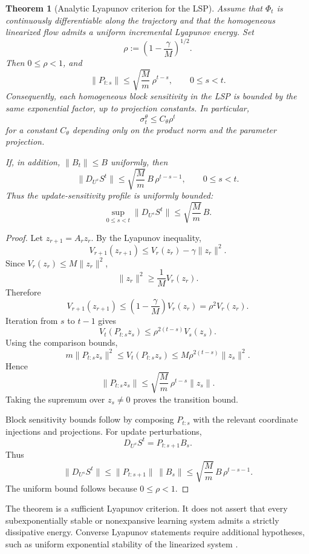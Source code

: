 \documentclass{article}
\newtheorem{theorem}{Theorem}[section]
\numberwithin{equation}{section}
\begin{document}
\begin{theorem}[Analytic Lyapunov criterion for the LSP]
\label{thm:fundamental-analytic-stability}
Assume that \(\Phi_t\) is continuously differentiable along the trajectory and
that the homogeneous linearized flow admits a uniform incremental Lyapunov
energy. Set
\[
\rho:=\left(1-\frac{\gamma}{M}\right)^{1/2}.
\]
Then \(0\le\rho<1\), and
\[
\|P_{t:s}\|
\le
\sqrt{\frac{M}{m}}\,\rho^{t-s},
\qquad
0\le s<t .
\]
Consequently, each homogeneous block sensitivity in the LSP is bounded by the
same exponential factor, up to projection constants. In particular,
\[
\sigma^\theta_t
\le
C_\theta\rho^t
\]
for a constant \(C_\theta\) depending only on the product norm and the parameter
projection.

If, in addition, \(\|B_t\|\le B\) uniformly, then
\[
\|D_{U^s}S^t\|
\le
\sqrt{\frac{M}{m}}\,B\,\rho^{t-s-1},
\qquad
0\le s<t .
\]
Thus the update-sensitivity profile is uniformly bounded:
\[
\sup_{0\le s<t}\|D_{U^s}S^t\|
\le
\sqrt{\frac{M}{m}}\,B .
\]
\end{theorem}

\begin{proof}
Let \(z_{r+1}=A_rz_r\). By the Lyapunov inequality,
\[
V_{r+1}(z_{r+1})
\le
V_r(z_r)-\gamma\|z_r\|^2 .
\]
Since \(V_r(z_r)\le M\|z_r\|^2\),
\[
\|z_r\|^2\ge \frac{1}{M}V_r(z_r).
\]
Therefore
\[
V_{r+1}(z_{r+1})
\le
\left(1-\frac{\gamma}{M}\right)V_r(z_r)
=
\rho^2 V_r(z_r).
\]
Iteration from \(s\) to \(t-1\) gives
\[
V_t(P_{t:s}z_s)
\le
\rho^{2(t-s)}V_s(z_s).
\]
Using the comparison bounds,
\[
m\|P_{t:s}z_s\|^2
\le
V_t(P_{t:s}z_s)
\le
M\rho^{2(t-s)}\|z_s\|^2 .
\]
Hence
\[
\|P_{t:s}z_s\|
\le
\sqrt{\frac{M}{m}}\,\rho^{t-s}\|z_s\|.
\]
Taking the supremum over \(z_s\ne0\) proves the transition bound.

Block sensitivity bounds follow by composing \(P_{t:s}\) with the relevant
coordinate injections and projections. For update perturbations,
\[
D_{U^s}S^t=P_{t:s+1}B_s .
\]
Thus
\[
\|D_{U^s}S^t\|
\le
\|P_{t:s+1}\|\,\|B_s\|
\le
\sqrt{\frac{M}{m}}\,B\,\rho^{t-s-1}.
\]
The uniform bound follows because \(0\le\rho<1\).
\end{proof}

The theorem is a sufficient Lyapunov criterion. It does not assert that every
subexponentially stable or nonexpansive learning system admits a strictly
dissipative energy. Converse Lyapunov statements require additional hypotheses,
such as uniform exponential stability of the linearized system
\cite{Khalil2002Nonlinear,Angeli2002Incremental}.
\end{document}
